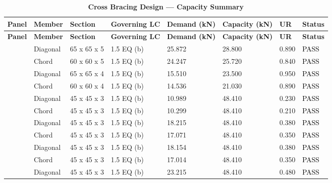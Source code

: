 \documentclass[12pt,a4paper]{report}
\numberwithin{table}{chapter}
\numberwithin{figure}{chapter}
\begin{document}
\vspace{1em}
\begin{longtable}{|C{2.0cm}|L{1.8cm}|C{2.2cm}|C{3.0cm}|C{1.8cm}|C{1.8cm}|C{1.2cm}|C{1.8cm}|}
\caption{\textbf{Cross Bracing Design --- Capacity Summary}}\\
\hline
\textbf{Panel} & \textbf{Member} & \textbf{Section} & \textbf{Governing LC} & \textbf{Demand (kN)} & \textbf{Capacity (kN)} & \textbf{UR} & \textbf{Status} \\[6pt]
\hline
\endfirsthead
\hline
\textbf{Panel} & \textbf{Member} & \textbf{Section} & \textbf{Governing LC} & \textbf{Demand (kN)} & \textbf{Capacity (kN)} & \textbf{UR} & \textbf{Status} \\[6pt]
\hline
\endhead
{} & Diagonal & 65 x 65 x 5 & 1.5 EQ (b) & 25.872 & 28.800 & 0.890 & \textcolor{black}{PASS} \\[6pt]
 & Chord & 60 x 60 x 5 & 1.5 EQ (b) & 24.247 & 25.720 & 0.840 & \textcolor{black}{PASS} \\[6pt]
\hline
{} & Diagonal & 65 x 65 x 4 & 1.5 EQ (b) & 15.510 & 23.500 & 0.950 & \textcolor{black}{PASS} \\[6pt]
 & Chord & 60 x 60 x 4 & 1.5 EQ (b) & 14.536 & 21.030 & 0.890 & \textcolor{black}{PASS} \\[6pt]
\hline
{} & Diagonal & 45 x 45 x 3 & 1.5 EQ (b) & 10.989 & 48.410 & 0.230 & \textcolor{black}{PASS} \\[6pt]
 & Chord & 45 x 45 x 3 & 1.5 EQ (b) & 10.299 & 48.410 & 0.210 & \textcolor{black}{PASS} \\[6pt]
\hline
{} & Diagonal & 45 x 45 x 3 & 1.5 EQ (b) & 18.215 & 48.410 & 0.380 & \textcolor{black}{PASS} \\[6pt]
 & Chord & 45 x 45 x 3 & 1.5 EQ (b) & 17.071 & 48.410 & 0.350 & \textcolor{black}{PASS} \\[6pt]
\hline
{} & Diagonal & 45 x 45 x 3 & 1.5 EQ (b) & 18.154 & 48.410 & 0.380 & \textcolor{black}{PASS} \\[6pt]
 & Chord & 45 x 45 x 3 & 1.5 EQ (b) & 17.014 & 48.410 & 0.350 & \textcolor{black}{PASS} \\[6pt]
\hline
{} & Diagonal & 45 x 45 x 3 & 1.5 EQ (b) & 23.215 & 48.410 & 0.480 & \textcolor{black}{PASS} \\[6pt]

\end{longtable}
\end{document}
